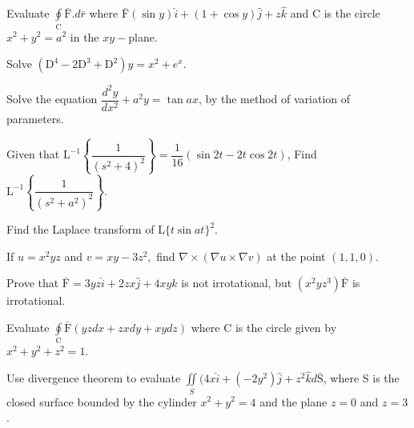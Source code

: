 \newpage \again

\item Evaluate $\oint\limits_\text{C} \bar{\text{F}}.d\bar{r}$ where $\bar{\text{F}}(\sin y)\hat{i}
  + ( 1 + \cos y)\hat{j}  + z \hat{k}$ and C is the circle $x^2 + y^2 = a^2$ in the $xy-$plane.

\markB
\partCo

\item \iitem Solve $\left(\text{D}^4 - 2\text{D}^3 + \text{D}^2\right)y = x^2 + e^x.$
\Or
\item Solve the equation $\dfrac{d^2y}{dx^2} + a^2y = \tan ax$, by the method of variation of parameters.
\ene

\item \iitem Given that  $\text{L}^{-1}\left\{\dfrac{1}{(s^2 + 4)^2}\right\} = \dfrac{1}{16}
  ( \sin 2t - 2t\cos 2t)$, Find $\text{L}^{-1}\left\{\dfrac{1}{(s^2 + a^2)^2}\right\}$.
\Or
\item Find the Laplace transform of L$\{t\sin at\}^2$.
\ene

\item \iitem If $ u = x^2yz $ and $ v = xy - 3z^2,$ find $\nabla \times (\nabla u \times \nabla v)$
  at the point $(1, 1, 0)$.
\Or
\item Prove that $ \bar{\text{F}} = 3yz\hat{i} + 2 zx\hat{j} + 4 xy \hat{k}$ is not irrotational,
  but $(x^2 y z^3)\bar{\text{F}}$ is irrotational.
\ene

\item \iitem Evaluate  $ \oint\limits_\text{C} \bar{\text{F}} ( yzdx + zxdy + xydz)$ where C
  is the circle given by $x^2 + y^2 + z^2 = 1$.
\Or
\item Use divergence theorem  to evaluate $\iint\limits_S (4x\hat{i} + (-2y^2)\hat{j} +
  z^2\hat{k}d\bar{\text{S}}$,
  where S is the closed surface bounded by the cylinder $x^2 + y^2 = 4$ and the plane $z=0$ and $z=3$.
\ene

\markC
\ene
